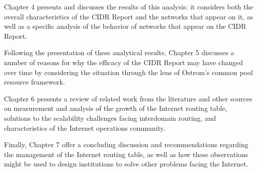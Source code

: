 Chapter 4 presents and discusses the results of this analysis: it considers both the overall characteristics of the CIDR Report and the networks that appear on it, as well as a specific analysis of the behavior of networks that appear on the CIDR Report. 

Following the presentation of these analytical results, Chapter 5 discusses a number of reasons for why the efficacy of the CIDR Report may have changed over time by considering the situation through the lens of Ostrom's common pool resource framework.

Chapter 6 presents a review of related work from the literature and other sources on measurement and analysis of the growth of the Internet routing table, solutions to the scalability challenges facing interdomain routing, and characteristics of the Internet operations community.

Finally, Chapter 7 offer a concluding discussion and recommendations regarding the management of the Internet routing table, as well as how these observations might be used to design institutions to solve other problems facing the Internet.
